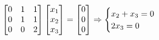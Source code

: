 \documentclass[preview]{standalone}
\begin{document}
\begin{align*}
\special{dvisvgm:raw <g id='unique000'>}\begin{bmatrix} 0 & 1 & 1 \\ 0 & 1 & 1 \\ 0 & 0 & 2 \end{bmatrix} \begin{bmatrix} x_1 \\ x_2 \\ x_3 \end{bmatrix} = \begin{bmatrix} 0 \\ 0 \\ 0 \end{bmatrix} \Rightarrow \begin{cases} x_2 + x_3 = 0 \\ 2x_3 = 0 \end{cases}\special{dvisvgm:raw </g>}
\end{align*}
\end{document}
